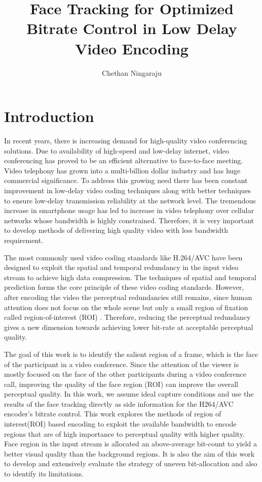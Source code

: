 \documentclass[11pt]{article} %
\title{Face Tracking for Optimized Bitrate Control in Low Delay Video Encoding}
\author{Chethan Ningaraju}
\begin{document}
\maketitle
\clearpage
\tableofcontents
\clearpage
\section{Introduction}
	In recent years, there is increasing demand for high-quality video conferencing solutions. Due to availability of high-speed and low-delay internet, video conferencing has proved to be an efficient alternative to face-to-face meeting. Video telephony has grown into a multi-billion dollar industry and has huge commercial significance. To address this growing need there has been constant improvement in  low-delay video coding techniques along with better techniques to ensure low-delay transmission reliability at the network level. The tremendous increase in smartphone usage has led to increase in video telephony over cellular networks whose bandwidth is highly constrained. Therefore, it is very important to develop methods of delivering high quality video with less bandwidth requirement. 

The most commonly used video coding standards like H.264/AVC have been designed to exploit the spatial and temporal redundancy in the input video stream to achieve high data compression. The techniques of spatial and temporal prediction forms the core principle of these video coding standards. However, after encoding the video the perceptual redundancies still remains, since human attention does not focus on the whole scene but only a small region of fixation called region-of-interest (ROI) \cite{Perception-model-of-face}. Therefore, reducing the perceptual redundancy gives a new dimension towards achieving lower bit-rate at acceptable perceptual quality.

The goal of this work is to identify the salient region of a frame, which is the face of the participant in a video conference. Since the attention of the viewer is mostly focused on the face of the other participants during a video conference call, improving the quality of the face region (ROI) can improve the overall perceptual quality. In this work, we assume ideal capture conditions and use the results of the face tracking directly as side information for the H264/AVC encoder's bitrate control. This work explores the methods of region of interest(ROI) based encoding to exploit the available bandwidth to encode regions that are of high importance to perceptual quality with higher quality. Face region in the input stream is allocated an above-average bit-count to yield a better visual quality than the background regions. It is also the aim of this work to develop and extensively evaluate the strategy of uneven bit-allocation and also to identify its limitations.
\end{document}
